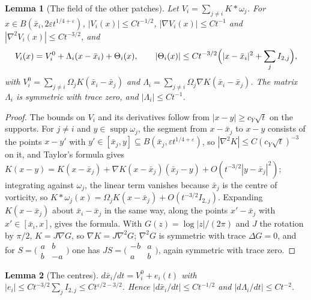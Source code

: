 \documentclass[11pt]{article}
\newtheorem{lemma}{Lemma}
\theoremstyle{definition}
\begin{document}
\begin{lemma}[The field of the other patches]\label{lem:field}
Let $V_i = \sum_{j\ne i} K*\omega_j$. For $x \in B(\bar x_i, 2\varepsilon t^{1/4+\varepsilon})$, $|V_i(x)| \le Ct^{-1/2}$, $|\nabla V_i(x)| \le Ct^{-1}$ and $|\nabla^2V_i(x)| \le Ct^{-3/2}$, and
\[
  V_i(x) = V_i^0 + \Lambda_i(x - \bar x_i) + \Theta_i(x),\qquad |\Theta_i(x)| \le Ct^{-3/2}\Bigl(|x - \bar x_i|^2 + \sum_jI_{2,j}\Bigr),
\]
with $V_i^0 = \sum_{j\ne i}\Omega_jK(\bar x_i - \bar x_j)$ and $\Lambda_i = \sum_{j\ne i}\Omega_j\nabla K(\bar x_i - \bar x_j)$. The matrix $\Lambda_i$ is symmetric with trace zero, and $|\Lambda_i| \le Ct^{-1}$.
\end{lemma}

\begin{proof}
The bounds on $V_i$ and its derivatives follow from $|x - y| \ge c_Y\sqrt t$ on the supports. For $j \ne i$ and $y \in \operatorname{supp}\omega_j$, the segment from $x - \bar x_j$ to $x - y$ consists of the points $x - y'$ with $y' \in [\bar x_j, y] \subseteq B(\bar x_j, \varepsilon t^{1/4+\varepsilon})$, so $|\nabla^2K| \le C(c_Y\sqrt t)^{-3}$ on it, and Taylor's formula gives $K(x - y) = K(x - \bar x_j) + \nabla K(x - \bar x_j)(\bar x_j - y) + O(t^{-3/2}|y - \bar x_j|^2)$; integrating against $\omega_j$, the linear term vanishes because $\bar x_j$ is the centre of vorticity, so $K*\omega_j(x) = \Omega_jK(x - \bar x_j) + O(t^{-3/2}I_{2,j})$. Expanding $K(x - \bar x_j)$ about $\bar x_i - \bar x_j$ in the same way, along the points $x' - \bar x_j$ with $x' \in [\bar x_i, x]$, gives the formula. With $G(z) = \log|z|/(2\pi)$ and $J$ the rotation by $\pi/2$, $K = J\nabla G$, so $\nabla K = J\nabla^2G$; $\nabla^2G$ is symmetric with trace $\Delta G = 0$, and for $S = \bigl(\begin{smallmatrix}a & b\\ b & -a\end{smallmatrix}\bigr)$ one has $JS = \bigl(\begin{smallmatrix}-b & a\\ a & b\end{smallmatrix}\bigr)$, again symmetric with trace zero.
\end{proof}

\begin{lemma}[The centres]\label{lem:centres}
$d\bar x_i/dt = V_i^0 + e_i(t)$ with $|e_i| \le Ct^{-3/2}\sum_jI_{2,j} \le Ct^{\varepsilon/2 - 3/2}$. Hence $|d\bar x_i/dt| \le Ct^{-1/2}$ and $|d\Lambda_i/dt| \le Ct^{-2}$.
\end{lemma}
\end{document}
